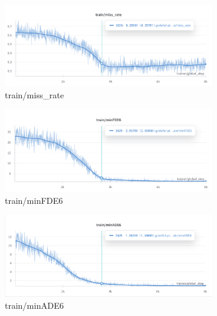 \begin{figure}[htbp]
    \centering
    \begin{subfigure}[b]{0.48\textwidth}
        \centering
        \includegraphics[clip, width=\textwidth]{figures/train_miss_rate.png}
        \caption{train/miss\_rate}
    \end{subfigure}
    \hfill
    \begin{subfigure}[b]{0.48\textwidth}
        \centering
        \includegraphics[clip, width=\textwidth]{figures/train_min_fde6.png}
        \caption{train/minFDE6}
    \end{subfigure}
    \vfill
    \begin{subfigure}[b]{0.48\textwidth}
        \centering
        \includegraphics[clip, width=\textwidth]{figures/train_min_ade6.png}
        \caption{train/minADE6}
    \end{subfigure}
    \hfill
    \begin{subfigure}[b]{0.48\textwidth}

\end{subfigure}
\end{figure}
